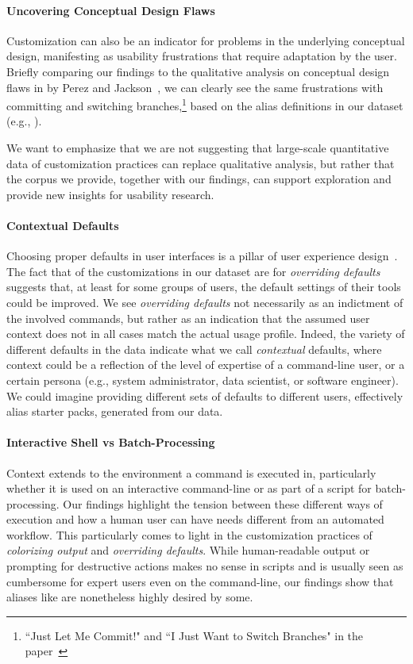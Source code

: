 \paragraph*{\bf Uncovering Conceptual Design Flaws}

Customization can also be an indicator for problems in the underlying conceptual design, manifesting as usability frustrations that require adaptation by the user.
Briefly comparing our findings to the qualitative analysis on conceptual design flaws in  by Perez and Jackson~\cite{perez:13}, we can clearly see the same frustrations with committing and switching branches,\footnote{``Just Let Me Commit!" and ``I Just Want to Switch Branches" in the paper~\cite{perez:13}} based on the alias definitions in our dataset (e.g., ).

We want to emphasize that we are not suggesting that large-scale quantitative data of customization practices can replace qualitative analysis, but rather that the corpus we provide, together with our findings, can support exploration and provide new insights for usability research.

\paragraph*{\bf Contextual Defaults}

Choosing proper defaults in user interfaces is a pillar of user experience design~\cite{nielsen2005power}.
The fact that  of the customizations in our dataset are for \emph{overriding defaults} suggests that, at least for some groups of users, the default settings of their tools could be improved.
We see \emph{overriding defaults} not necessarily as an indictment of the involved commands, but rather as an indication that the assumed user context does not in all cases match the actual usage profile.
Indeed, the variety of different defaults in the data indicate what we call \emph{contextual} defaults, where context could be a reflection of the level of expertise of a command-line user, or a certain persona (e.g., system administrator, data scientist, or software engineer).
We could imagine providing different sets of defaults to different users, effectively alias starter packs, generated from our data.

\paragraph*{\bf Interactive Shell vs Batch-Processing}

Context extends to the environment a command is executed in, particularly whether it is used on an interactive command-line or as part of a script for batch-processing.
Our findings highlight the tension between these different ways of execution and how a human user can have needs different from an automated workflow.
This particularly comes to light in the customization practices of \emph{colorizing output} and \emph{overriding defaults}.
While human-readable output or prompting for destructive actions makes no sense in scripts and is usually seen as cumbersome for expert users even on the command-line, our findings show that aliases like  are nonetheless highly desired by some.
